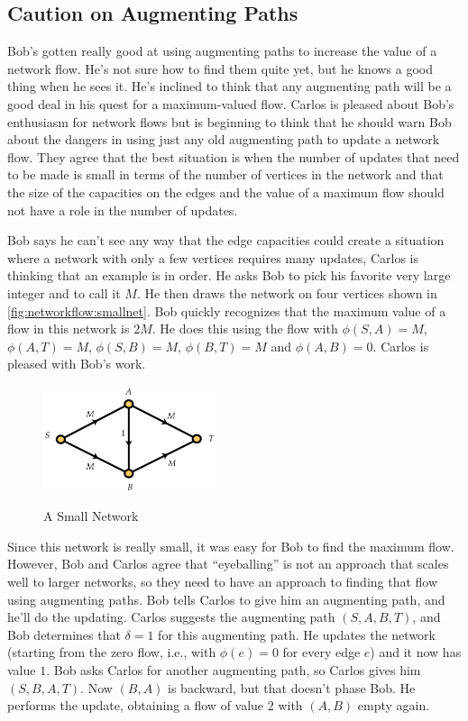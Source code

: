 \subsection{Caution on Augmenting Paths}

Bob's gotten really good at using augmenting paths to increase the
value of a network flow. He's not sure how to find them quite yet, but
he knows a good thing when he sees it. He's inclined to think that any
augmenting path will be a good deal in his quest for a maximum-valued
flow. Carlos is pleased about Bob's enthusiasm for network flows but
is beginning to think that he should warn Bob about the dangers in using just any
old augmenting path to update a network flow. They agree that the best
situation is when the number of updates that need to be made is small
in terms of the number of vertices in the network and that the size of
the capacities on the edges and the value of a maximum flow should not
have a role in the number of updates. 

Bob says he can't see any way that the edge capacities could create
a situation where a network with only a few vertices requires many
updates, Carlos is thinking that an example is in order. He asks Bob to pick
his favorite very large integer and to call it $M$. He then draws the
network on four vertices shown in
\autoref{fig:networkflow:smallnet}. Bob quickly recognizes that the
maximum value of a flow in this network is $2M$. He does this using
the flow with $\phi(S,A)=M$, $\phi(A,T)=M$, $\phi(S,B)=M$,
$\phi(B,T)=M$ and $\phi(A,B)=0$. Carlos is pleased with Bob's work.

\begin{figure}
\begin{center}
\includegraphics*[width=2in]{networkflow-figs/smallnet}\\
\caption{A Small Network\label{fig:networkflow:smallnet}}
\end{center}
\end{figure}

Since this network is really small, it was easy for Bob to find the
maximum flow. However, Bob and Carlos agree that ``eyeballing'' is not
an approach that scales well to larger networks, so they need to have
an approach to finding that flow using augmenting paths. Bob tells
Carlos to give him an augmenting path, and he'll do the
updating. Carlos suggests the augmenting path $(S,A,B,T)$, and Bob
determines that $\delta=1$ for this augmenting path. He updates the
network (starting from the zero flow, i.e., with $\phi(e)=0$ for every
edge $e$) and it now has value $1$. Bob asks Carlos for another
augmenting path, so Carlos gives him $(S,B,A,T)$. Now $(B,A)$ is
backward, but that doesn't phase Bob. He performs the update,
obtaining a flow of value $2$ with $(A,B)$ empty again.

